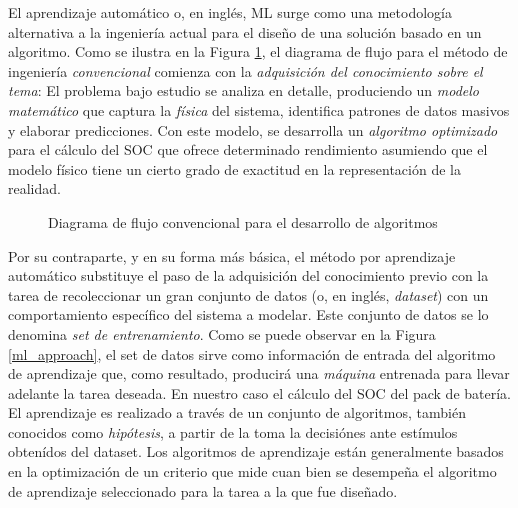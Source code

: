 \documentclass[10pt,a4paper]{article}
\begin{document}
\noindent El aprendizaje autom\'atico o, en ingl\'es, \acrfull{ML} surge como
una metodolog\'ia alternativa a la ingenier\'ia actual para el diseño de una
soluci\'on basado en un algoritmo. Como se ilustra en la Figura
\ref{curr_eng_approach}, el diagrama de flujo para el m\'etodo de ingenier\'ia
\emph{convencional} comienza con la \emph{adquisici\'on del conocimiento sobre
el tema}: El problema bajo estudio se analiza en detalle, produciendo un
\emph{modelo matem\'atico} que captura la \emph{f\'isica} del sistema,
identifica patrones de datos masivos y elaborar predicciones. Con este modelo,
se desarrolla un \emph{algoritmo optimizado} para el cálculo del \acrshort{SOC}
que ofrece determinado rendimiento asumiendo que el modelo f\'isico tiene un
cierto grado de exactitud en la representaci\'on de la realidad.

\begin{figure}[h!]
    \begin{center}
    \end{center}
    \caption{Diagrama de flujo convencional para el desarrollo de algoritmos}
    \label{curr_eng_approach}
\end{figure}

\noindent Por su contraparte, y en su forma m\'as b\'asica, el m\'etodo por
aprendizaje autom\'atico substituye el paso de la adquisici\'on del conocimiento
previo con la tarea de recoleccionar un gran conjunto de datos (o, en ingl\'es,
\emph{dataset}) con un comportamiento espec\'ifico del sistema a modelar. Este
conjunto de datos se lo denomina \emph{set de entrenamiento}. Como se puede
observar en la Figura \ref{ml_approach}, el set de datos sirve como información
de entrada del algoritmo de aprendizaje que, como resultado, producirá una
\emph{m\'aquina} entrenada para llevar adelante la tarea deseada. En nuestro
caso el cálculo del \acrshort{SOC} del pack de batería. El aprendizaje es
realizado a trav\'es de un conjunto de algoritmos, tambi\'en conocidos como
\emph{hip\'otesis}, a partir de la toma la decisi\'ones ante estímulos obtenídos
del dataset. Los algoritmos de aprendizaje est\'an generalmente basados en la
optimizaci\'on de un criterio que mide cuan bien se desempeña el algoritmo de
aprendizaje seleccionado para la tarea a la que fue diseñado.
\end{document}
